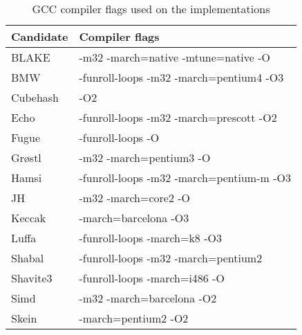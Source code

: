 \begin{table}
  \centering
  \caption{GCC compiler flags used on the implementations}
  \begin{tabular}{ | l | l | }
    \hline
    \textbf{Candidate} & \textbf{Compiler flags}            \\ \hline
     BLAKE       & -m32 -march=native -mtune=native -O      \\ \hline
     \ac{BMW}    & -funroll-loops -m32 -march=pentium4 -O3  \\ \hline
     Cubehash    & -O2                                      \\ \hline
     Echo        & -funroll-loops -m32 -march=prescott -O2  \\ \hline
     Fugue       & -funroll-loops -O                        \\ \hline
     Grøstl      & -m32 -march=pentium3 -O                  \\ \hline
     Hamsi       & -funroll-loops -m32 -march=pentium-m -O3 \\ \hline
     JH          & -m32 -march=core2 -O                     \\ \hline
     Keccak      & -march=barcelona -O3                     \\ \hline
     Luffa       & -funroll-loops -march=k8 -O3             \\ \hline
     Shabal      & -funroll-loops -m32 -march=pentium2      \\ \hline
     Shavite3    & -funroll-loops -march=i486 -O            \\ \hline
     Simd        & -m32 -march=barcelona -O2                \\ \hline
     Skein       & -march=pentium2 -O2                      \\ \hline
  \end{tabular}
  \label{tbl:sha3:compilerflags}
\end{table}
